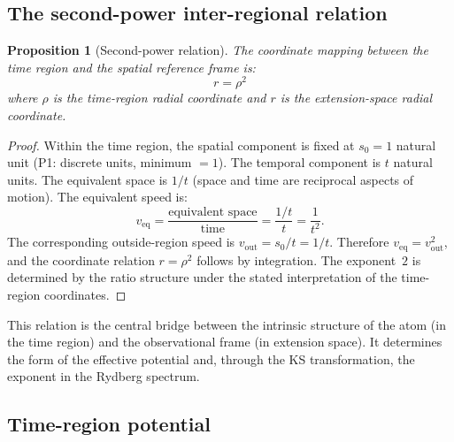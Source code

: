 \documentclass[11pt,a4paper]{article}
\newtheorem{proposition}[theorem]{Proposition}
\begin{document}
\subsection{The second-power inter-regional relation}

\begin{proposition}[Second-power relation]
\label{prop:second-power}
The coordinate mapping between the time region and the spatial reference frame is:
\[
r = \rho^2
\]
where $\rho$ is the time-region radial coordinate and $r$ is the extension-space radial coordinate.
\end{proposition}

\begin{proof}
Within the time region, the spatial component is fixed at $s_0 = 1$ natural unit (P1: discrete units, minimum $= 1$). The temporal component is $t$ natural units. The equivalent space is $1/t$ (space and time are reciprocal aspects of motion). The equivalent speed is:
\[
v_{\mathrm{eq}} = \frac{\text{equivalent space}}{\text{time}} = \frac{1/t}{t} = \frac{1}{t^2}.
\]
The corresponding outside-region speed is $v_{\mathrm{out}} = s_0/t = 1/t$. Therefore $v_{\mathrm{eq}} = v_{\mathrm{out}}^2$, and the coordinate relation $r = \rho^2$ follows by integration. The exponent~$2$ is determined by the ratio structure under the stated interpretation of the time-region coordinates.
\end{proof}

This relation is the central bridge between the intrinsic structure of the atom (in the time region) and the observational frame (in extension space). It determines the form of the effective potential and, through the KS transformation, the exponent in the Rydberg spectrum.

\subsection{Time-region potential}
\end{document}
